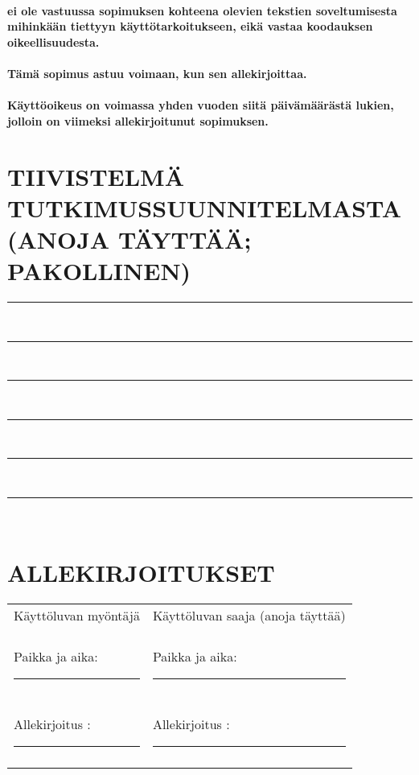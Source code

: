 \documentclass[a4paper,finnish]{article}
\begin{document}
\paragraph{ ei ole vastuussa sopimuksen 
kohteena olevien tekstien soveltumisesta mihinkään tiettyyn
käyttötarkoitukseen, eikä vastaa koodauksen oikeellisuudesta.}

\paragraph{Tämä sopimus astuu voimaan, kun  sen
allekirjoittaa.}

\paragraph{Käyttöoikeus on voimassa yhden vuoden siitä päivämäärästä lukien,
jolloin  on viimeksi allekirjoitunut
sopimuksen.}

\section{TIIVISTELMÄ TUTKIMUSSUUNNITELMASTA (ANOJA TÄYTTÄÄ; PAKOLLINEN)}


\begin{centering}
\Large
\rule{12cm}{.005in} \\
\rule{12cm}{.005in} \\
\rule{12cm}{.005in} \\
\rule{12cm}{.005in} \\
\rule{12cm}{.005in} \\
\rule{12cm}{.005in} \\
\end{centering}

\section{ALLEKIRJOITUKSET}

\begin{tabular}{ll}
Käyttöluvan myöntäjä & Käyttöluvan saaja (anoja täyttää) \\
 & \\
Paikka ja aika: \rule{2in}{.01in} & Paikka ja aika: \rule{2in}{.01in} \\ \\
Allekirjoitus : \rule{2in}{.01in} & Allekirjoitus : \rule{2in}{.01in} \\ \\

\end{tabular}
\end{document}

